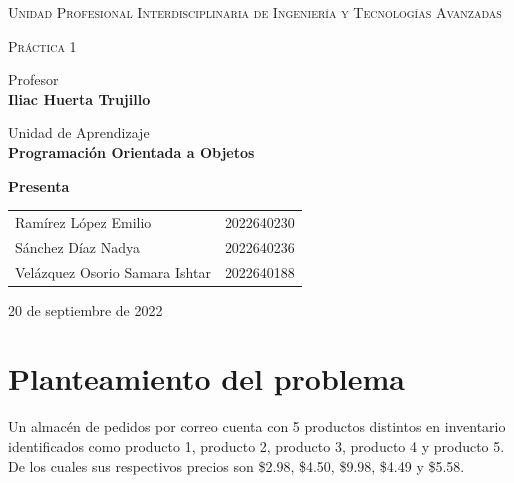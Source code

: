 \documentclass[12pt, letterpaper]{article}
\begin{document}
	\begin{center}
		\Large
		\textsc{Unidad Profesional Interdisciplinaria de Ingeniería y Tecnologías Avanzadas}
		
		\vspace{1.2cm}
		\huge
		\textsc{Práctica 1}
		
	
	\vspace{1.2cm}
	
		\large
		Profesor\\
		\vspace{0.3cm}
		\large
		\textbf{Iliac Huerta Trujillo}
		
		\vspace{1.2cm}
		\large
		Unidad de Aprendizaje \\
		\vspace{0.3cm}
		\large
		\textbf{Programación Orientada a Objetos}
	
		\vspace{1.2cm}
		\large
		\textbf{Presenta}\\
		\vspace{0.3cm}

    \begin{table}[h]

        \centering
        \large
        \begin{tabular}{lr}
            Ramírez López Emilio & 2022640230  \\
            Sánchez Díaz Nadya & 2022640236 \\
            Velázquez Osorio Samara Ishtar & 2022640188 \\
        \end{tabular}

    \end{table}
	
		\vspace{1.2cm}
		20 de septiembre de 2022
		
	\end{center}
	
    \newpage
    
    \tableofcontents
    \listoffigures
    \newpage
    
    \section{Planteamiento del problema}
    Un almacén de pedidos por correo cuenta con 5 productos distintos en inventario identificados como producto 1, producto 2, producto 3, producto 4 y producto 5. De los cuales sus respectivos precios son \$2.98, \$4.50, \$9.98, \$4.49 y \$5.58.
    
\end{document}
